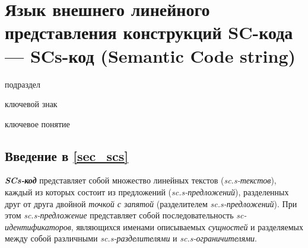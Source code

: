 \section{Язык внешнего линейного представления конструкций SC-кода --- SCs-код (Semantic Code string)}
\label{sec_scs}

\begin{SCn}
\begin{scnrelfromlist}{подраздел}
\end{scnrelfromlist}

\bigskip

\begin{scnrelfromlist}{ключевой знак}
\end{scnrelfromlist}

\begin{scnrelfromlist}{ключевое понятие}
\end{scnrelfromlist}
\end{SCn}

\subsection*{Введение в \ref{sec_scs}}

\begin{SCn}
\end{SCn}

\textbf{\textit{SCs-код}} представляет собой множество линейных текстов (\textit{sc.s-текстов}), каждый из которых состоит из предложений (\textit{sc.s-предложений}), разделенных друг от друга двойной \textit{точкой с запятой} (разделителем \textit{sc.s-предложений}). При этом \mbox{\textit{sc.s-предложение}} представляет собой последовательность \textit{sc-идентификаторов}, являющихся именами описываемых \textit{сущностей} и разделяемых между собой различными \textit{sc.s-разделителями} и \textit{sc.s-ограничителями}.

